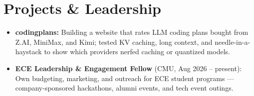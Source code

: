 \documentclass[11pt, letterpaper]{article}
\begin{document}
\section{Projects \& Leadership}
\begin{itemize}
  \item \textbf{codingplans:} Building a website that rates LLM coding plans bought from Z.AI, MiniMax, and Kimi; tested KV caching, long context, and needle-in-a-haystack to show which providers nerfed caching or quantized models.
  \item \textbf{ECE Leadership \& Engagement Fellow} (CMU, Aug 2026 -- present): Own budgeting, marketing, and outreach for ECE student programs --- company-sponsored hackathons, alumni events, and tech event outings.
\end{itemize}
\end{document}
